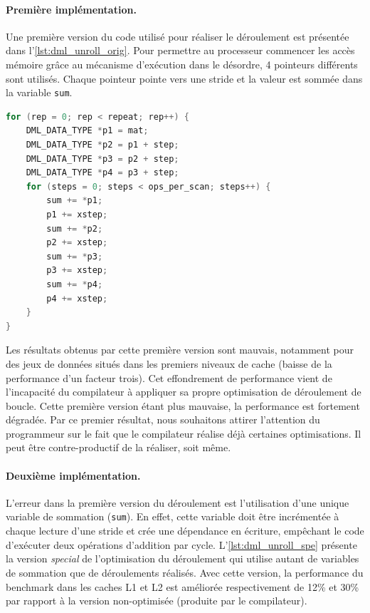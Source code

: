     \paragraph{Première implémentation.}
    
        Une première version du code utilisé pour réaliser le déroulement est présentée dans l'\autoref{lst:dml_unroll_orig}. Pour permettre au processeur commencer les accès mémoire grâce au mécanisme d'exécution dans le désordre, 4 pointeurs différents sont utilisés. Chaque pointeur pointe vers une stride et la valeur est sommée dans la variable \verb|sum|.  
    
        \begin{lstlisting}[label=lst:dml_unroll_orig ,language=C, caption=Première version du déroulement de la boucle par 4.]
for (rep = 0; rep < repeat; rep++) {
    DML_DATA_TYPE *p1 = mat;
    DML_DATA_TYPE *p2 = p1 + step;
    DML_DATA_TYPE *p3 = p2 + step;
    DML_DATA_TYPE *p4 = p3 + step;
    for (steps = 0; steps < ops_per_scan; steps++) {
        sum += *p1;
        p1 += xstep;
        sum += *p2;
        p2 += xstep;
        sum += *p3;
        p3 += xstep;
        sum += *p4;
        p4 += xstep;
    }
}
\end{lstlisting}
    
         Les résultats obtenus par cette première version sont mauvais, notamment pour des jeux de données situés dans les premiers niveaux de cache (baisse de la performance d'un facteur trois). Cet effondrement de performance vient de l'incapacité du compilateur à appliquer sa propre optimisation de déroulement de boucle. Cette première version étant plus mauvaise, la performance est fortement dégradée. Par ce premier résultat, nous souhaitons attirer l'attention du programmeur sur le fait que le compilateur réalise déjà certaines optimisations. Il peut être contre-productif de la réaliser, soit même.

    \paragraph{Deuxième implémentation.}
    
        L'erreur dans la première version du déroulement est l'utilisation d'une unique variable de sommation (\verb=sum=). En effet, cette variable doit être incrémentée à chaque lecture d'une stride et crée une dépendance en écriture, empêchant le code d'exécuter deux opérations d'addition par cycle. L'\autoref{lst:dml_unroll_spe} présente la version \textit{special} de l'optimisation du déroulement qui utilise autant de variables de sommation que de déroulements réalisés. Avec cette version, la performance du benchmark dans les caches L1 et L2 est améliorée respectivement de 12\% et 30\% par rapport à la version non-optimisée (produite par le compilateur).
    
